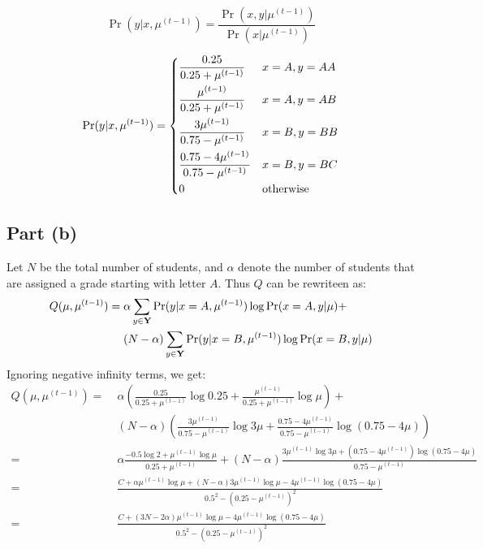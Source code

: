 \documentclass[11pt,a4paper,titlepage]{article}
\begin{document}
\[
    \Pr(y | x, \mu^{(t-1)}) = \frac{\Pr(x, y | \mu^{(t-1)})}{\Pr(x | \mu^{(t-1)})}
\]

\[
    \Pr(y | x, \mu^{(t-1)}) =
    \begin{dcases}
        \frac{0.25}{0.25 + \mu^{(t-1)}} & x = A, y = AA \\
        \frac{\mu^{(t-1)}}{0.25 + \mu^{(t-1)}} & x = A, y = AB \\
        \frac{3\mu^{(t-1)}}{0.75 - \mu^{(t-1)}} & x = B, y = BB \\
        \frac{0.75 - 4\mu^{(t-1)}}{0.75 - \mu^{(t-1)}} & x = B, y = BC \\
        0 & \rm otherwise
    \end{dcases}
\]

\subsection*{Part (b)}

Let $N$ be the total number of students, and $\alpha$ denote the number of
students that are assigned a grade starting with letter $A$. Thus $Q$ can be
rewriteen as:
\begin{align*}
    Q(\mu, \mu^{(t-1)}) =\; &\alpha\sum_{y \in \rm\bf Y} \Pr(y | x=A, \mu^{(t-1)}) \log \Pr(x=A, y | \mu) + \\
                          &(N-\alpha)\sum_{y \in \rm\bf Y} \Pr(y | x=B, \mu^{(t-1)}) \log \Pr(x=B, y | \mu)
\end{align*}
Ignoring negative infinity terms, we get:
\begin{align*}
    Q(\mu, \mu^{(t-1)}) =\; &\alpha\left( \frac{0.25}{0.25 + \mu^{(t-1)}} \log 0.25 + \frac{\mu^{(t-1)}}{0.25 + \mu^{(t-1)}} \log \mu \right) + \\
                          &(N-\alpha)\left( \frac{3\mu^{(t-1)}}{0.75 - \mu^{(t-1)}} \log 3\mu + \frac{0.75 - 4\mu^{(t-1)}}{0.75 - \mu^{(t-1)}} \log (0.75 - 4\mu) \right) \\
                        =\; &\alpha \frac{-0.5 \log 2 + \mu^{(t-1)} \log \mu}{0.25 + \mu^{(t-1)}} +
                          (N-\alpha) \frac{3\mu^{(t-1)} \log 3\mu + (0.75 - 4\mu^{(t-1)}) \log (0.75 - 4\mu)}{0.75 - \mu^{(t-1)}} \\
                        =\; &\frac{C + \alpha\mu^{(t-1)}\log\mu + (N-\alpha)3\mu^{(t-1)}\log\mu - 4\mu^{(t-1)}\log(0.75-4\mu)}{0.5^2 - (0.25 - \mu^{(t-1)})^2} \\
                        =\; &\frac{C + (3N-2\alpha)\mu^{(t-1)}\log\mu - 4\mu^{(t-1)}\log(0.75-4\mu)}{0.5^2 - (0.25 - \mu^{(t-1)})^2}
\end{align*}
\end{document}
